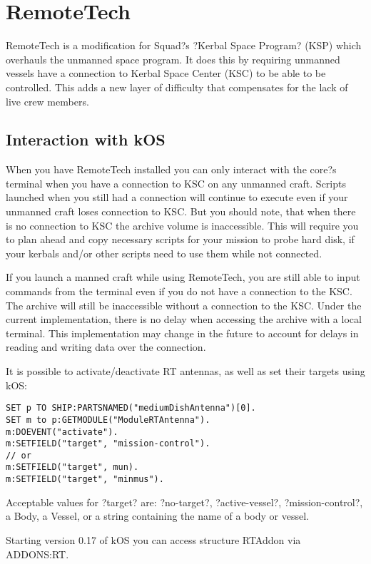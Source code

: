 	\section{RemoteTech}%
	RemoteTech is a modification for Squad?s ?Kerbal Space Program? (KSP) which overhauls the unmanned space program. It does this by requiring unmanned vessels have a connection to Kerbal Space Center (KSC) to be able to be controlled. This adds a new layer of difficulty that compensates for the lack of live crew members.
	\subsection{Interaction with kOS}
When you have RemoteTech installed you can only interact with the core?s terminal when you have a connection to KSC on any unmanned craft. Scripts launched when you still had a connection will continue to execute even if your unmanned craft loses connection to KSC. But you should note, that when there is no connection to KSC the archive volume is inaccessible. This will require you to plan ahead and copy necessary scripts for your mission to probe hard disk, if your kerbals and/or other scripts need to use them while not connected.

If you launch a manned craft while using RemoteTech, you are still able to input commands from the terminal even if you do not have a connection to the KSC. The archive will still be inaccessible without a connection to the KSC. Under the current implementation, there is no delay when accessing the archive with a local terminal. This implementation may change in the future to account for delays in reading and writing data over the connection.

It is possible to activate/deactivate RT antennas, as well as set their targets using kOS:

\begin{Verbatim}[frame=single]
SET p TO SHIP:PARTSNAMED("mediumDishAntenna")[0].
SET m to p:GETMODULE("ModuleRTAntenna").
m:DOEVENT("activate").
m:SETFIELD("target", "mission-control").
// or
m:SETFIELD("target", mun).
m:SETFIELD("target", "minmus").
\end{Verbatim}

Acceptable values for ?target? are: ?no-target?, ?active-vessel?, ?mission-control?, a Body, a Vessel, or a string containing the name of a body or vessel.

Starting version 0.17 of kOS you can access structure RTAddon via ADDONS:RT.

